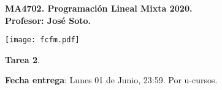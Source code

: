 \documentclass{article}
\theoremstyle{plain}
\theoremstyle{definition}
\theoremstyle{Azul}
\begin{document}
\setlength{\headheight}{14pt}
\vspace*{-1.2 cm}
\begin{minipage}{0.6\textwidth}
	\begin{flushleft}
		\hspace*{-0.5cm}\textbf{MA4702. Programación Lineal Mixta 2020.}\\
		\hspace*{-0.5cm}\textbf{Profesor: José Soto.}\\
	\end{flushleft}
\end{minipage}
\begin{minipage}{0.36\textwidth}
	\begin{flushright}
		\texttt{[image: fcfm.pdf]}
	\end{flushright}
\end{minipage}
\bigskip

\newif\ifsol
\soltrue
\solfalse

\begin{center}
  \LARGE \textbf{Tarea 2}.\\
\end{center}
\bigskip

\noindent\textbf{Fecha entrega}: Lunes 01 de Junio, 23:59. Por u-cursos.\\
\end{document}
